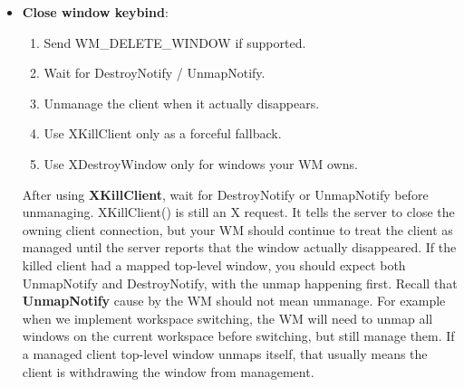 \documentclass{report}
\begin{document}
\begin{itemize}
\begin{itemize}
                \item send WM\_DELETE\_WINDOW
                \item fallback: XKillClient(client\_window)
            \end{itemize}
            WM internal window close:
            \begin{itemize}
                \item XDestroyWindow(wm\_owned\_window)
                \item unmanage/free WM state
            \end{itemize}
        \item \textbf{Close window keybind}: 
            \begin{enumerate}
                \item Send WM\_DELETE\_WINDOW if supported.
                \item Wait for DestroyNotify / UnmapNotify.
                \item Unmanage the client when it actually disappears.
                \item Use XKillClient only as a forceful fallback.
                \item Use XDestroyWindow only for windows your WM owns.
            \end{enumerate}
            After using \textbf{XKillClient}, wait for DestroyNotify or UnmapNotify before unmanaging. XKillClient() is still an X request. It tells the server to close the owning client connection, but your WM should continue to treat the client as managed until the server reports that the window actually disappeared.
            \bigbreak \noindent 
            If the killed client had a mapped top-level window, you should expect both UnmapNotify and DestroyNotify, with the unmap happening first.
            \bigbreak \noindent 
            Recall that \textbf{UnmapNotify} cause by the WM should not mean unmanage. For example when we implement workspace switching, the WM will need to unmap all windows on the current workspace before switching, but still manage them.
            \bigbreak \noindent 
            If a managed client top-level window unmaps itself, that usually means the client is withdrawing the window from management.

    \end{itemize}


    \pagebreak 
\end{document}
